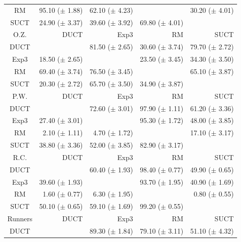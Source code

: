 \documentclass[conference]{IEEEtran}
\begin{document}
\begin{table}
\begin{center}
\begin{tabular}{|c|rrrr|}
             RM    & 95.10 ($\pm$ 1.88)   & 62.10 ($\pm$ 4.23)   &          & 30.20 ($\pm$ 4.01)   \\
           SUCT    & 24.90 ($\pm$ 3.37)   & 39.60 ($\pm$ 3.92)   & 69.80 ($\pm$ 4.01)   &          \\
\hline
\hline
       O.Z.   &       DUCT   &       Exp3   &         RM   &       SUCT   \\
\hline
           DUCT    &          & 81.50 ($\pm$ 2.65)   & 30.60 ($\pm$ 3.74)   & 79.70 ($\pm$ 2.72)   \\
           Exp3    & 18.50 ($\pm$ 2.65)   &          & 23.50 ($\pm$ 3.45)   & 34.30 ($\pm$ 3.50)   \\
             RM    & 69.40 ($\pm$ 3.74)   & 76.50 ($\pm$ 3.45)   &          & 65.10 ($\pm$ 3.87)   \\
           SUCT    & 20.30 ($\pm$ 2.72)   & 65.70 ($\pm$ 3.50)   & 34.90 ($\pm$ 3.87)   &          \\
\hline
\hline
   P.W.   &       DUCT   &       Exp3   &         RM   &       SUCT   \\
\hline
           DUCT    &          & 72.60 ($\pm$ 3.01)   & 97.90 ($\pm$ 1.11)   & 61.20 ($\pm$ 3.36)   \\
           Exp3    & 27.40 ($\pm$ 3.01)   &          & 95.30 ($\pm$ 1.72)   & 48.00 ($\pm$ 3.85)   \\
             RM    & 2.10 ($\pm$ 1.11)   & 4.70 ($\pm$ 1.72)   &          & 17.10 ($\pm$ 3.17)   \\
           SUCT    & 38.80 ($\pm$ 3.36)   & 52.00 ($\pm$ 3.85)   & 82.90 ($\pm$ 3.17)   &          \\
\hline
\hline
R.C.   &       DUCT   &       Exp3   &         RM   &       SUCT   \\
\hline
           DUCT    &          & 60.40 ($\pm$ 1.93)   & 98.40 ($\pm$ 0.77)   & 49.90 ($\pm$ 0.65)   \\
           Exp3    & 39.60 ($\pm$ 1.93)   &          & 93.70 ($\pm$ 1.95)   & 40.90 ($\pm$ 1.69)   \\
             RM    & 1.60 ($\pm$ 0.77)   & 6.30 ($\pm$ 1.95)   &          & 0.80 ($\pm$ 0.55)   \\
           SUCT    & 50.10 ($\pm$ 0.65)   & 59.10 ($\pm$ 1.69)   & 99.20 ($\pm$ 0.55)   &          \\
\hline
\hline
        Runners   &       DUCT   &       Exp3   &         RM   &       SUCT   \\
\hline
           DUCT    &          & 89.30 ($\pm$ 1.84)   & 79.10 ($\pm$ 3.11)   & 51.10 ($\pm$ 4.32)   \\

\end{tabular}
\end{center}
\end{table}
\end{document}
